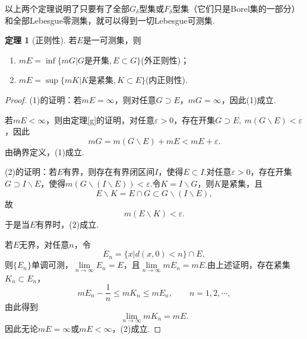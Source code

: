 \documentclass[lang=cn,12pt]{ctexart}
\theoremstyle{definition}
\newtheorem{theorem}{定理}
\theoremstyle{plain}
\begin{document}
以上两个定理说明了只要有了全部$G_{\delta}$型集或$F_{\delta}$型集（它们只是Borel集的一部分）和全部Lebesgue零测集，就可以得到一切Lebesgue可测集.
\begin{theorem}[正则性]
	若$E$是一可测集，则
	\begin{enumerate}
		\item $mE=\inf\{mG|G\text{是开集},E\subset G\}$(外正则性)；
		\item $mE=\sup\{mK|K\text{是紧集},K\subset E\}$(内正则性).
	\end{enumerate}
\end{theorem}
\begin{proof}
	(1)的证明：若$mE=\infty$，则对任意$G\supset E$，$mG=\infty$，因此(1)成立.
	
	若$mE<\infty$，则由定理\ref{g}的证明，对任意$\varepsilon>0$，存在开集$G\supset E,\ m(G\backslash E)<\varepsilon$，因此
	$$mG=m(G\backslash E)+mE<mE+\varepsilon.$$
	由确界定义，(1)成立.
	
	(2)的证明：若$E$有界，则存在有界闭区间$I$，使得$E\subset I$.对任意$\varepsilon>0$，存在开集$G\supset I\backslash E$，使得$m(G\backslash(I\backslash E))<\varepsilon$.令$K=I\backslash G$，则$K$是紧集，且
	$$E\backslash K=E\cap G\subset G\backslash(I\backslash E),$$
	故
	$$m(E\backslash K)<\varepsilon.$$
	于是当$E$有界时，(2)成立.
	
	若$E$无界，对任意$n$，令
	$$E_n=\{x|d(x,0)<n\}\cap E,$$
	则$\{E_n\}$单调可测，$\lim\limits_{n\to\infty}E_n=E$，且$\lim\limits_{n\to\infty}mE_n=mE$.由上述证明，存在紧集$K_n\subset E_n$，
	$$mE_n-\frac{1}{n}\leqslant mK_n\leqslant mE_n,\qquad n=1,2,\cdots,$$
	由此得到
	$$\lim\limits_{n\to\infty}mK_n=mE.$$
	因此无论$mE=\infty$或$mE<\infty$，(2)成立.
\end{proof}
\end{document}
